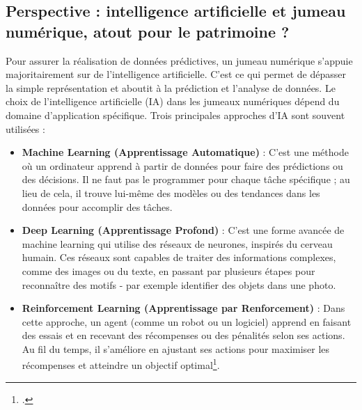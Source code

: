  
        \subsection{Perspective : intelligence artificielle et jumeau numérique, atout pour le patrimoine ?}

Pour assurer la réalisation de données prédictives, un jumeau numérique s’appuie majoritairement sur de l’intelligence artificielle. C'est ce qui permet de dépasser la simple représentation et aboutit à la prédiction et l'analyse de données. Le choix de l'intelligence artificielle (IA) dans les jumeaux numériques dépend du domaine d'application spécifique. Trois principales approches d'IA sont souvent utilisées :\\

\begin{itemize}
\item \textbf{Machine Learning (Apprentissage Automatique)} : C'est une méthode où un ordinateur apprend à partir de données pour faire des prédictions ou des décisions. Il ne faut pas le programmer pour chaque tâche spécifique ; au lieu de cela, il trouve lui-même des modèles ou des tendances dans les données pour accomplir des tâches.
\item \textbf{Deep Learning (Apprentissage Profond)} : C'est une forme avancée de machine learning qui utilise des réseaux de neurones, inspirés du cerveau humain. Ces réseaux sont capables de traiter des informations complexes, comme des images ou du texte, en passant par plusieurs étapes pour reconnaître des motifs - par exemple identifier des objets dans une photo.
\item  \textbf{Reinforcement Learning (Apprentissage par Renforcement)} : Dans cette approche, un agent (comme un robot ou un logiciel) apprend en faisant des essais et en recevant des récompenses ou des pénalités selon ses actions. Au fil du temps, il s'améliore en ajustant ses actions pour maximiser les récompenses et atteindre un objectif optimal\footcite{jinBigDataMachine2024}.\\
\end{itemize}

